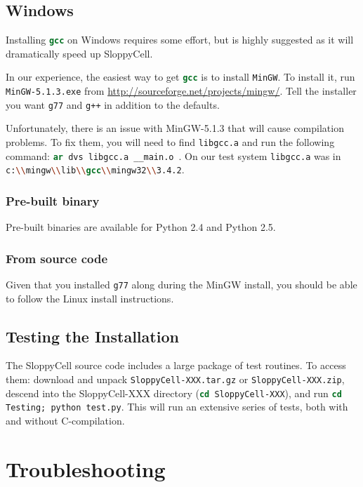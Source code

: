 \documentclass[12pt]{article}
\newcommand{\shell}[1]{\lstinline[language=csh, showstringspaces=False]!#1!}
\begin{document}
\subsection{Windows}
Installing \shell{gcc} on Windows requires some effort, but is highly suggested as it will dramatically speed up SloppyCell.

In our experience, the easiest way to get \shell{gcc} is to install \shell{MinGW}.
To install it, run \shell{MinGW-5.1.3.exe} from
\url{http://sourceforge.net/projects/mingw/}.
Tell the installer you want \shell{g77} and \shell{g++} in addition to the defaults.

Unfortunately, there is an issue with MinGW-5.1.3 that will cause compilation problems. To fix them, you will need to find \shell{libgcc.a} and run the following command:
\shell{ar dvs libgcc.a __main.o}~\cite{bib:SCuser:ar}.
On our test system \shell{libgcc.a} was in \shell{c:\\mingw\\lib\\gcc\\mingw32\\3.4.2}.

\subsubsection{Pre-built binary}
Pre-built binaries are available for Python 2.4 and Python 2.5.

\subsubsection{From source code}
Given that you installed \shell{g77} along during the MinGW install, you should be able to follow the Linux install instructions.

\subsection{Testing the Installation}\label{sec:test}
The SloppyCell source code includes a large package of test routines.
To access them: download and unpack \shell{SloppyCell-XXX.tar.gz} or \shell{SloppyCell-XXX.zip}, descend into the SloppyCell-XXX directory (\shell{cd SloppyCell-XXX}), and run \shell{cd Testing; python test.py}.
This will run an extensive series of tests, both with and without C-compilation.

\section{Troubleshooting}
\end{document}
